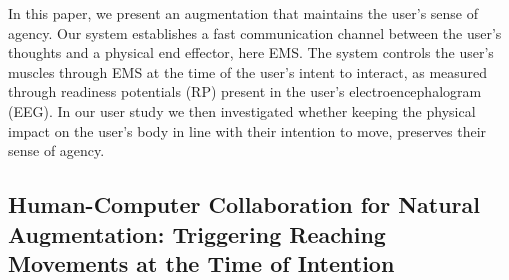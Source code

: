 In this paper, we present an augmentation that maintains the user's sense of agency. Our system establishes a fast communication channel between the user's thoughts and a physical end effector, here EMS. The system controls the user's muscles through EMS at the time of the user's intent to interact, as measured through readiness potentials (RP) present in the user's electroencephalogram (EEG). In our user study we then investigated whether keeping the physical impact on the user's body in line with their intention to move, preserves their sense of agency.

\subsection{Human-Computer Collaboration for Natural Augmentation: Triggering Reaching Movements at the Time of Intention}




